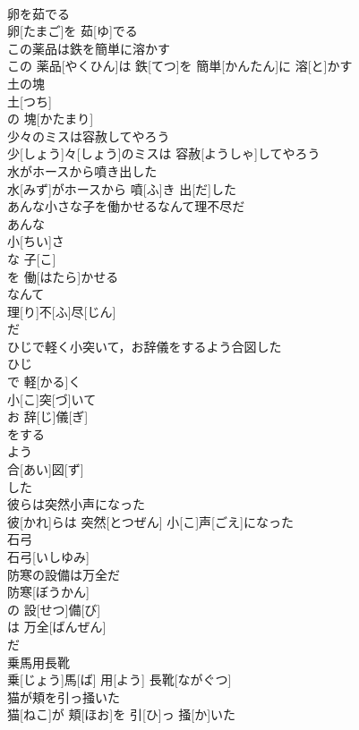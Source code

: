 \documentclass[8pt]{extreport}
\begin{document}
\begin{CJK}{UTF8}{min}
\\	卵を茹でる	
\\	卵[たまご]を 茹[ゆ]でる
\\	この薬品は鉄を簡単に溶かす	
\\	この 薬品[やくひん]は 鉄[てつ]を 簡単[かんたん]に 溶[と]かす
\\	土の塊	
\\	土[つち]
\\	の 塊[かたまり]
\\	少々のミスは容赦してやろう	
\\	少[しょう]々[しょう]のミスは 容赦[ようしゃ]してやろう
\\	水がホースから噴き出した	
\\	水[みず]がホースから 噴[ふ]き 出[だ]した
\\	あんな小さな子を働かせるなんて理不尽だ	
\\	あんな 
\\	小[ちい]さ 
\\	な 子[こ]
\\	を 働[はたら]かせる 
\\	なんて 
\\	理[り]不[ふ]尽[じん]
\\	だ
\\	ひじで軽く小突いて，お辞儀をするよう合図した	
\\	ひじ 
\\	で 軽[かる]く 
\\	小[こ]突[づ]いて 
\\	お 辞[じ]儀[ぎ]
\\	をする 
\\	よう 
\\	合[あい]図[ず]
\\	した 
\\	彼らは突然小声になった	
\\	彼[かれ]らは 突然[とつぜん] 小[こ]声[ごえ]になった
\\	石弓	
\\	石弓[いしゆみ]
\\	防寒の設備は万全だ	
\\	防寒[ぼうかん]
\\	の 設[せつ]備[び]
\\	は 万全[ばんぜん]
\\	だ
\\	乗馬用長靴	
\\	乗[じょう]馬[ば] 用[よう] 長靴[ながぐつ]
\\	猫が頬を引っ掻いた	
\\	猫[ねこ]が 頬[ほお]を 引[ひ]っ 掻[か]いた

\end{CJK}
\end{document}
